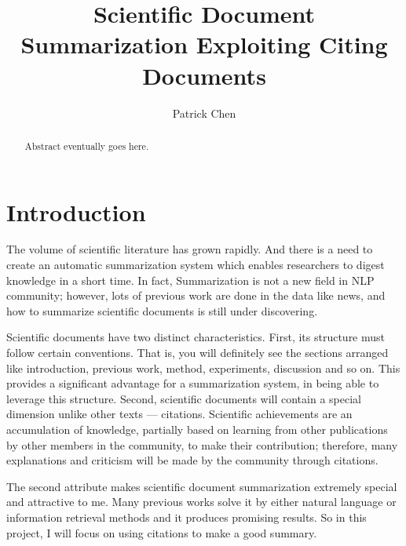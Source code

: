 \documentclass[hyp]{socreport}
\begin{document}
\title{Scientific Document Summarization Exploiting Citing Documents}
\author{Patrick Chen}
\maketitle

\begin{abstract}
Abstract eventually goes here.
\end{abstract}

\section{Introduction}

  The volume of scientific literature has grown rapidly. And there is a need to create an automatic 
summarization system which enables researchers to digest knowledge in a short time. In fact, Summarization 
is not a new field in NLP community; however, lots of previous work are done in the data like news, and how 
to summarize scientific documents is still under discovering.

  Scientific documents have two distinct characteristics. First, its structure must follow certain conventions. 
That is, you will definitely see the sections arranged like introduction, previous work, method, experiments, 
discussion and so on. This provides a significant advantage for a summarization system, in being able to leverage this 
structure. Second, scientific documents will contain a special dimension unlike other texts –-- citations. Scientific achievements 
are an accumulation of knowledge, partially based on learning from other publications by other members in the community, to make their 
contribution; therefore, many explanations and criticism will be made by the community through citations.  

  The second attribute makes scientific document summarization extremely special and attractive to me.
Many 
previous works solve it by either natural language or information retrieval methods and it produces promising 
results. So in this project, I will focus on using citations to make a good summary.   
\end{document}
